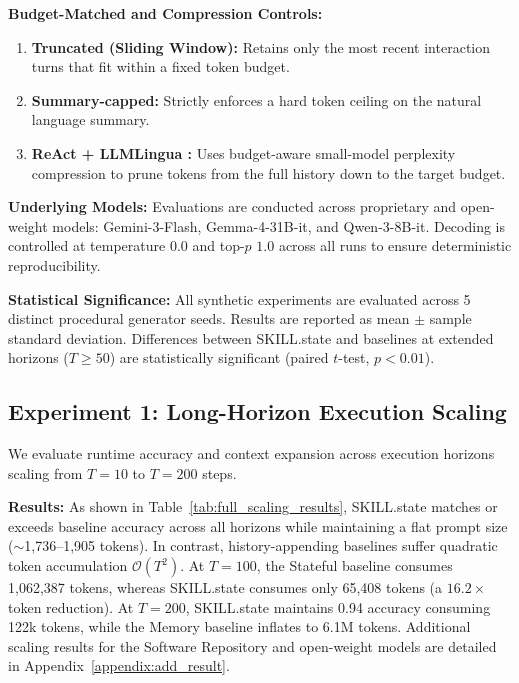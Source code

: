 \documentclass[11pt]{article}
\begin{document}
\noindent\textbf{Budget-Matched and Compression Controls:}
\begin{enumerate}[leftmargin=*]
    \item \textbf{Truncated (Sliding Window):} Retains only the most recent interaction turns that fit within a fixed token budget.
    \item \textbf{Summary-capped:} Strictly enforces a hard token ceiling on the natural language summary.
    \item \textbf{ReAct + LLMLingua \citep{jiang2023llmlingua}:} Uses budget-aware small-model perplexity compression to prune tokens from the full history down to the target budget.
\end{enumerate}

\noindent\textbf{Underlying Models:} Evaluations are conducted across proprietary and open-weight models: Gemini-3-Flash, Gemma-4-31B-it, and Qwen-3-8B-it. Decoding is controlled at temperature $0.0$ and top-$p$ $1.0$ across all runs to ensure deterministic reproducibility.

\noindent\textbf{Statistical Significance:} All synthetic experiments are evaluated across 5 distinct procedural generator seeds. Results are reported as mean $\pm$ sample standard deviation. Differences between SKILL.state and baselines at extended horizons ($T \ge 50$) are statistically significant (paired $t$-test, $p < 0.01$).

\subsection{Experiment 1: Long-Horizon Execution Scaling}
\label{subsec:exp1_scaling}

We evaluate runtime accuracy and context expansion across execution horizons scaling from $T=10$ to $T=200$ steps.

\noindent\textbf{Results:} As shown in Table~\ref{tab:full_scaling_results}, SKILL.state matches or exceeds baseline accuracy across all horizons while maintaining a flat prompt size ($\sim$1,736--1,905 tokens). In contrast, history-appending baselines suffer quadratic token accumulation $\mathcal{O}(T^2)$. At $T=100$, the Stateful baseline consumes 1,062,387 tokens, whereas SKILL.state consumes only 65,408 tokens (a $16.2\times$ token reduction). At $T=200$, SKILL.state maintains 0.94 accuracy consuming 122k tokens, while the Memory baseline inflates to 6.1M tokens. Additional scaling results for the Software Repository and open-weight models are detailed in Appendix~\ref{appendix:add_result}.
\end{document}
